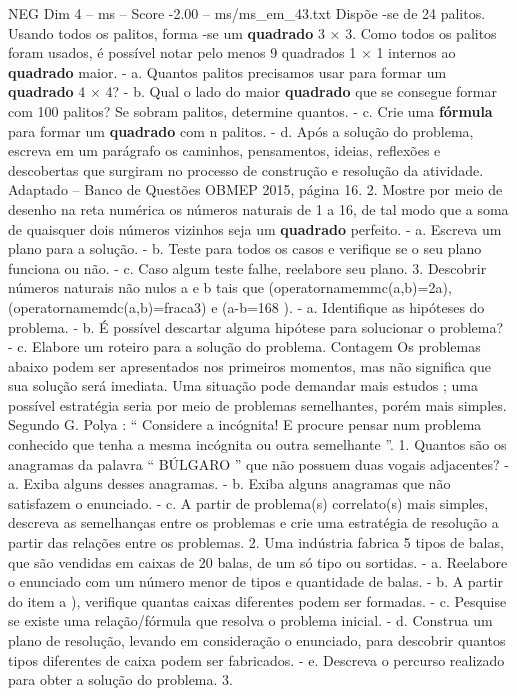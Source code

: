 \begin{textsample}{NEG Dim 4 – ms – Score -2.00 – ms/ms\_em\_43.txt}
Dispõe -se de 24 palitos.
Usando todos os palitos, forma -se um \textbf{quadrado} 3 × 3.
Como todos os palitos foram usados, é possível notar pelo menos 9 quadrados 1 × 1 internos ao \textbf{quadrado} maior. - a.
Quantos palitos precisamos usar para formar um \textbf{quadrado} 4 × 4? - b.
Qual o lado do maior \textbf{quadrado} que se consegue formar com 100 palitos?
Se sobram palitos, determine quantos. - c.
Crie uma \textbf{fórmula} para formar um \textbf{quadrado} com n palitos. - d.
Após a solução do problema, escreva em um parágrafo os caminhos, pensamentos, ideias, reflexões e descobertas que surgiram no processo de construção e resolução da atividade.
Adaptado – Banco de Questões OBMEP 2015, página 16. 2.
Mostre por meio de desenho na reta numérica os números naturais de 1 a 16, de tal modo que a soma de quaisquer dois números vizinhos seja um \textbf{quadrado} perfeito. - a.
Escreva um plano para a solução. - b.
Teste para todos os casos e verifique se o seu plano funciona ou não. - c.
Caso algum teste falhe, reelabore seu plano. 3.
Descobrir números naturais não nulos a e b tais que (operatornamemmc(a,b)=2a), (operatornamemdc(a,b)=fraca3) e (a-b=168 ). - a.
Identifique as hipóteses do problema. - b.
É possível descartar alguma hipótese para solucionar o problema? - c.
Elabore um roteiro para a solução do problema.
Contagem Os problemas abaixo podem ser apresentados nos primeiros momentos, mas não significa que sua solução será imediata.
Uma situação pode demandar mais estudos ; uma possível estratégia seria por meio de problemas semelhantes, porém mais simples.
Segundo G.
Polya : “ Considere a incógnita!
E procure pensar num problema conhecido que tenha a mesma incógnita ou outra semelhante ”. 1.
Quantos são os anagramas da palavra “ BÚLGARO ” que não possuem duas vogais adjacentes? - a.
Exiba alguns desses anagramas. - b.
Exiba alguns anagramas que não satisfazem o enunciado. - c.
A partir de problema(s) correlato(s) mais simples, descreva as semelhanças entre os problemas e crie uma estratégia de resolução a partir das relações entre os problemas. 2.
Uma indústria fabrica 5 tipos de balas, que são vendidas em caixas de 20 balas, de um só tipo ou sortidas. - a.
Reelabore o enunciado com um número menor de tipos e quantidade de balas. - b.
A partir do item a ), verifique quantas caixas diferentes podem ser formadas. - c.
Pesquise se existe uma relação/fórmula que resolva o problema inicial. - d.
Construa um plano de resolução, levando em consideração o enunciado, para descobrir quantos tipos diferentes de caixa podem ser fabricados. - e.
Descreva o percurso realizado para obter a solução do problema. 3.

\end{textsample}

